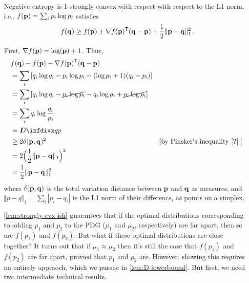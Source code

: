 \begin{lemma} \label{lem:negent-strongly-cvx-1norm}
    Negative entropy is 1-strongly convex with 
    respect with respect to the L1 norm, i.e.,
    $f(\mathbf p) = \sum_i p_i \log p_i$ satisfies
    \[
        f(\mathbf q) \ge f(\mathbf p) + \nabla f(\mathbf p)^{\sf T} (\mathbf q - \mathbf p)
            + \frac12 \Vert \mathbf p - \mathbf q \Vert_1^2.
    \]
\end{lemma}
\begin{lproof}
    First, $\nabla f(\mathbf p) = \log(\mathbf p) + 1$. 
    Thus, 
    \begin{align*}
        &f(\mat q) - f(\mat p) - \nabla f(\mat p)^{\sf T} (\mat q - \mat p)\\
        &= \sum_i \left[ q_i \log q_i - p_i \log p_i - (\log p_i + 1)(q_i-p_i) \right]\\
        &= \sum_i \left[ q_i \log q_i - \Cancel{p_i \log p_i} - q_i \log p_i + \Cancel{p_i \log p_i} \right]\\
        &= \sum_i q_i \log \frac{q_i}{p_i} \\
        &= \kldiv{q}{p} \\
        &\ge 2 \delta(\mat p, \mat q)^2
            &[\text{by Pinsker's inequality
                \parencite{pinsker-inequality}
            }] \\
        &= 2 \Big(\frac12 \Vert \mat p - \mat q \Vert_1 \Big)^2 \\
        &= \frac12 \Vert \mat p - \mat q \Vert_1^2
    \end{align*}
    where $\delta(\mathbf p, \mathbf q)$ is the total variation distance between $\mathbf p$ and $\mathbf q$ as measures, and $\Vert p - q \Vert_1 = \sum_i |p_i - q_i|$ is the L1 norm of their difference, as
    points on a simplex. 
\end{lproof}

\cref{lem:strongly-cvx-ish} guarantees
that if the optimal distributions corresponding to adding $p_1$ and $p_2$ to the PDG
($\mu_1$ and $\mu_2$, respectively) are far apart, then so are
$f(p_1)$ and $f(p_2)$.  But what if these optimal distributions are close together?
It turns out that if $\mu_1 \approx \mu_2$ then it's still the case that $f(p_1)$ and $f(p_2)$ are far apart, provied that $p_1$ and $p_2$ are.
However, showing this requires an entirely appraoch, which we pursue in \cref{lem:D-lowerbound}.
But first, we need two intermediate technical results.

